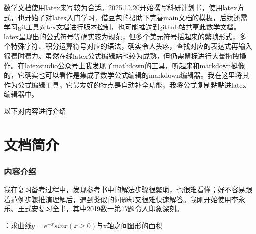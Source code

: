 \documentclass[12pt]{report}
\begin{document}
   数学文档使用latex来写较为合适。2025.10.20开始撰写科研计划书，使用latex方式，也开始了对latex入门学习，借豆包的帮助下完善main文档的模板，后续还需学习git工具对tex文档进行版本控制，也可能推送到github站共享此数学文档。latex呈现出的公式符号等确实较为规范，但多个美元符号括起来的繁琐形式，多个特殊字符、积分运算符号对应的语法，确实令人头疼，查找对应的表达式再输入很费时费力。虽然在线latex公式编辑站也较为成熟，但仍需鼠标进行大量拖拽操作。在latexstudio公众号上我发现了mathdown的工具，听起来和markdown挺像的，它确实也可以看作是集成了数学公式编辑的markdown编辑器。我在这里将其作为公式编辑工具，它最友好的特点是自动补全功能，我将公式复制粘贴进latex编辑器中。
   
   以下对内容进行介绍
   
   \clearpage
   
   \chapter*{文档简介}
   \subsection*{\centering 内容介绍}
   我在复习备考过程中，发现参考书中的解法步骤很繁琐，也很难看懂；好不容易跟着范例步骤推演理解后，遇到类似的问题却又很难快速解答。我刚开始使用李永乐、王式安复习全书，其中2019数一第17题令人印象深刻。
   
   ：求曲线$y=e^{-x}sinx\left(x\geqslant0\right)$与x轴之间图形的面积
   
   \vspace{10pt}
   
\end{document}
